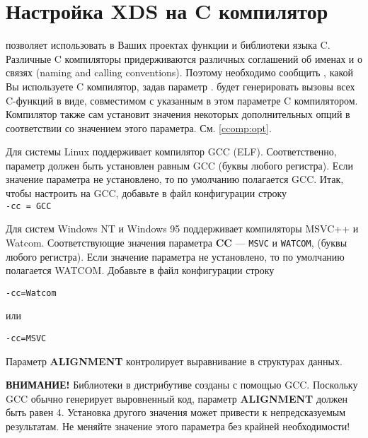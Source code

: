 
\ifgencode\else\JNO\fi

\chapter{Настройка XDS на C компилятор}\label{ccomp}


\XDS{} позволяет использовать в Ваших проектах функции и библиотеки
языка C. Различные C компиляторы придерживаются различных соглашений 
об именах и о связях (naming and calling conventions).
Поэтому необходимо сообщить \XDS{}, какой Вы используете C компилятор,
задав параметр .
\XDS{} будет генерировать вызовы всех C-функций в виде, совместимом с 
указанным в этом параметре C компилятором.
Компилятор также сам установит значения некоторых дополнительных опций
в соответствии со значением этого параметра.
\iflinux \else См. \ref{ccomp:opt}. \fi %

\iflinux
  Для системы Linux \XDS{} поддерживает компилятор GCC (ELF). 
  Соответственно, параметр  должен быть установлен равным
  GCC (буквы любого регистра). Если значение параметра не установлено, 
  то по умолчанию полагается GCC. Итак, чтобы настроить 
  \XDS{} на GCC, добавьте в файл конфигурации строку \\
  \verb'-cc = GCC' \\
\fi

\ifwinnt
  Для систем Windows NT и Windows 95 \XDS{} поддерживает компиляторы 
  MSVC++ и Watcom.
  Соответствующие значения параметра {\bf CC} --- \verb'MSVC'
  и \verb'WATCOM', (буквы любого регистра). 
  Если значение параметра не установлено, то по умолчанию полагается 
  WATCOM.
  Добавьте в файл конфигурации строку

  \verb'-cc=Watcom'

  или

  \verb'-cc=MSVC'

\fi

Параметр {\bf ALIGNMENT} контролирует выравнивание в структурах данных.

\iflinux
  {\bf ВНИМАНИЕ!} 
  Библиотеки в дистрибутиве \XDS{} созданы с помощью GCC.
  Поскольку GCC обычно генерирует выровненный код, параметр
  {\bf ALIGNMENT} должен быть равен 4. Установка другого 
  значения может привести к непредсказуемым результатам.
  Не меняйте значение этого параметра без крайней необходимости!
\fi

